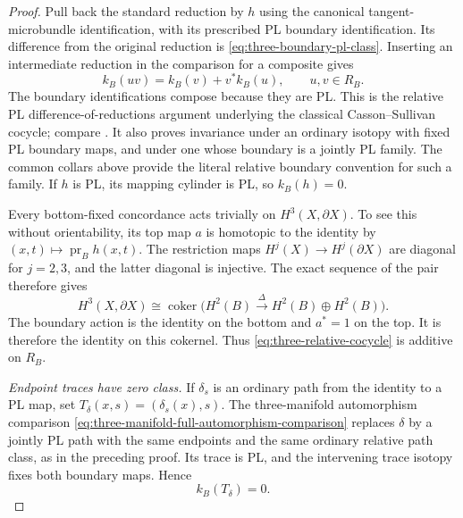 \begin{proof}
Pull back the standard reduction by $h$ using the canonical
tangent-microbundle identification, with its prescribed PL
boundary identification.  Its difference from the original
reduction is \eqref{eq:three-boundary-pl-class}.  Inserting
an intermediate reduction in the comparison for a composite
gives
\begin{equation}\label{eq:three-relative-cocycle}
 k_B(uv)=k_B(v)+v^*k_B(u),\qquad u,v\in R_B.
\end{equation}
The boundary identifications compose because they are PL.
This is the relative PL difference-of-reductions argument
underlying the classical Casson--Sullivan cocycle; compare
\cite[Proposition~2.23 and its full proof, pp.~2508--2509]{Galvin2026CassonSullivan}.
It also proves invariance under an ordinary isotopy with
fixed PL boundary maps, and under one whose boundary is a
jointly PL family.  The common collars above provide the
literal relative boundary convention for such a family.
If $h$ is PL, its mapping cylinder is PL, so $k_B(h)=0$.

Every bottom-fixed concordance acts trivially on
$H^3(X,\partial X)$.  To see this without orientability,
its top map $a$ is homotopic to the identity by
$(x,t)\mapsto\operatorname{pr}_B h(x,t)$.  The restriction
maps $H^j(X)\to H^j(\partial X)$ are diagonal for $j=2,3$,
and the latter diagonal is injective.  The exact sequence
of the pair therefore gives
\begin{equation}\label{eq:three-relative-trivial-action}
 H^3(X,\partial X)
 \cong\operatorname{coker}\bigl(H^2(B)
                 \xrightarrow{\Delta}H^2(B)\oplus H^2(B)\bigr).
\end{equation}
The boundary action is the identity on the bottom and $a^*=1$
on the top.  It is therefore the identity on this cokernel.
Thus \eqref{eq:three-relative-cocycle} is additive on $R_B$.

\emph{Endpoint traces have zero class.}
If $\delta_s$ is an ordinary path from the identity to a PL
map, set $T_\delta(x,s)=(\delta_s(x),s)$.  The
three-manifold automorphism comparison
\eqref{eq:three-manifold-full-automorphism-comparison}
replaces $\delta$ by a jointly PL path with the same
endpoints and the same ordinary relative path class, as in
the preceding proof.  Its trace is PL, and the intervening
trace isotopy fixes both boundary maps.  Hence
\begin{equation}\label{eq:three-trace-class-zero}
 k_B(T_\delta)=0.
\end{equation}


\end{proof}
